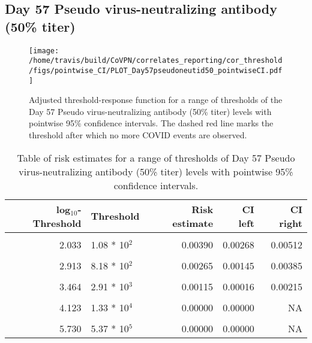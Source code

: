 \documentclass[]{book}
\theoremstyle{definition}
\theoremstyle{definition}
\theoremstyle{definition}
\newcommand{\1}{\mathbbm{1}}
\begin{document}
\newpage

\newpage

\newpage

\hypertarget{day-57-pseudo-virus-neutralizing-antibody-50-titer}{%
\subsection{Day 57 Pseudo virus-neutralizing antibody (50\% titer)}\label{day-57-pseudo-virus-neutralizing-antibody-50-titer}}

\begin{figure}[H]
\centering
\texttt{[image: /home/travis/build/CoVPN/correlates\_reporting/cor\_threshold/figs/pointwise\_CI/PLOT\_Day57pseudoneutid50\_pointwiseCI.pdf]}
\caption{Adjusted threshold-response function for a range of thresholds of the
  Day 57 Pseudo virus-neutralizing antibody (50\% titer) levels with pointwise 95\% confidence intervals. The dashed red line marks the threshold after which no more COVID events are observed. }
\end{figure}
\begin{table}[!h]

\caption{\label{tab:unnamed-chunk-351}Table of risk estimates for a range of thresholds of Day 57 Pseudo virus-neutralizing antibody (50\% titer) levels with pointwise 95\% confidence intervals.}
\centering
\begin{tabular}[t]{rlrrr}
\toprule
log$_{10}$-Threshold & Threshold & Risk estimate & CI left & CI right\\
\midrule
\cellcolor{gray!6}{0.699} & \cellcolor{gray!6}{5.00 * 10$^0$} & \cellcolor{gray!6}{0.00508} & \cellcolor{gray!6}{0.00376} & \cellcolor{gray!6}{0.00639}\\
2.033 & 1.08 * 10$^2$ & 0.00390 & 0.00268 & 0.00512\\
\cellcolor{gray!6}{2.447} & \cellcolor{gray!6}{2.80 * 10$^2$} & \cellcolor{gray!6}{0.00347} & \cellcolor{gray!6}{0.00223} & \cellcolor{gray!6}{0.00471}\\
2.913 & 8.18 * 10$^2$ & 0.00265 & 0.00145 & 0.00385\\
\cellcolor{gray!6}{3.196} & \cellcolor{gray!6}{1.57 * 10$^3$} & \cellcolor{gray!6}{0.00235} & \cellcolor{gray!6}{0.00112} & \cellcolor{gray!6}{0.00358}\\
3.464 & 2.91 * 10$^3$ & 0.00115 & 0.00016 & 0.00215\\
\cellcolor{gray!6}{3.736} & \cellcolor{gray!6}{5.45 * 10$^3$} & \cellcolor{gray!6}{0.00134} & \cellcolor{gray!6}{0.00013} & \cellcolor{gray!6}{0.00255}\\
4.123 & 1.33 * 10$^4$ & 0.00000 & 0.00000 & NA\\
\cellcolor{gray!6}{4.629} & \cellcolor{gray!6}{4.26 * 10$^4$} & \cellcolor{gray!6}{0.00000} & \cellcolor{gray!6}{0.00000} & \cellcolor{gray!6}{NA}\\
5.730 & 5.37 * 10$^5$ & 0.00000 & 0.00000 & NA\\
\bottomrule
\end{tabular}
\end{table}
\end{document}
